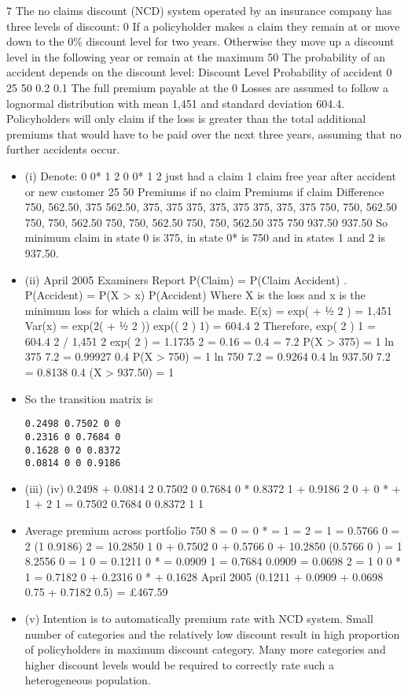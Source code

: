 \documentclass[a4paper,12pt]{article}
\begin{document}
7
The no claims discount (NCD) system operated by an insurance company has three levels of discount: 0%
If a policyholder makes a claim they remain at or move down to the 0\% discount level
for two years. Otherwise they move up a discount level in the following year or remain at the maximum 50%
The probability of an accident depends on the discount level:
Discount Level Probability of accident
0%
25%
50%
0.2
0.1
The full premium payable at the 0%
Losses are assumed to follow a lognormal distribution with mean 1,451 and standard deviation 604.4.
Policyholders will only claim if the loss is greater than the total additional premiums that would have to be paid over the next three years, assuming that no further accidents occur.


\newpage 

\begin{itemize}
    \item 

(i)
Denote:
0
0*
1
2
0
0*
1
2
just had a claim
1 claim free year after accident or new customer
25%
50%
Premiums if no claim Premiums if claim Difference
750, 562.50, 375
562.50, 375, 375
375, 375, 375
375, 375, 375 750, 750, 562.50
750, 750, 562.50
750, 750, 562.50
750, 750, 562.50 375
750
937.50
937.50
So minimum claim in state 0 is 375, in state 0* is 750 and in states 1 and 2 is
937.50.
\item (ii)
April 2005
Examiners Report
P(Claim) = P(Claim Accident) . P(Accident)
= P(X > x) P(Accident)
Where X is the loss and x is the minimum loss for which a claim will be made.
E(x) = exp( + 1⁄2 2 ) = 1,451
Var(x) = exp(2( + 1⁄2 2 )) exp(( 2 ) 1) = 604.4 2
Therefore,
exp( 2 ) 1 = 604.4 2 / 1,451 2
exp( 2 ) = 1.1735
2
= 0.16
= 0.4
= 7.2
P(X > 375) = 1 ln 375 7.2
= 0.99927
0.4
P(X > 750) = 1 ln 750 7.2
= 0.9264
0.4
ln 937.50 7.2
= 0.8138
0.4
(X > 937.50) = 1
\item So the transition matrix is
\begin{verbatim}
0.2498 0.7502 0 0
0.2316 0 0.7684 0
0.1628 0 0 0.8372
0.0814 0 0 0.9186
\end{verbatim}
\item (iii)
(iv)
0.2498
+ 0.0814 2
0.7502 0
0.7684 0 *
0.8372 1 + 0.9186 2
0 + 0 * + 1 + 2
1 = 0.7502 0.7684
0
0.8372 1
1
\item Average premium across portfolio
750
8
= 0
= 0 *
= 1
= 2
= 1
= 0.5766 0
= 2 (1 0.9186)
2 = 10.2850 1
0 + 0.7502 0 + 0.5766 0 + 10.2850 (0.5766 0 ) = 1
8.2556 0 = 1
0 = 0.1211
0 * = 0.0909
1 = 0.7684 0.0909 = 0.0698
2 = 1
0
0 *
1 = 0.7182
0
+ 0.2316 0 * + 0.1628
April 2005
(0.1211 + 0.0909 + 0.0698
0.75 + 0.7182
0.5) = £467.59
\item (v) Intention is to automatically premium rate with NCD system. Small number of categories and the relatively low discount result in high proportion of policyholders in maximum discount category. Many more categories and higher discount levels would be required to correctly rate such a heterogeneous population.
\end{itemize}
\end{document}
